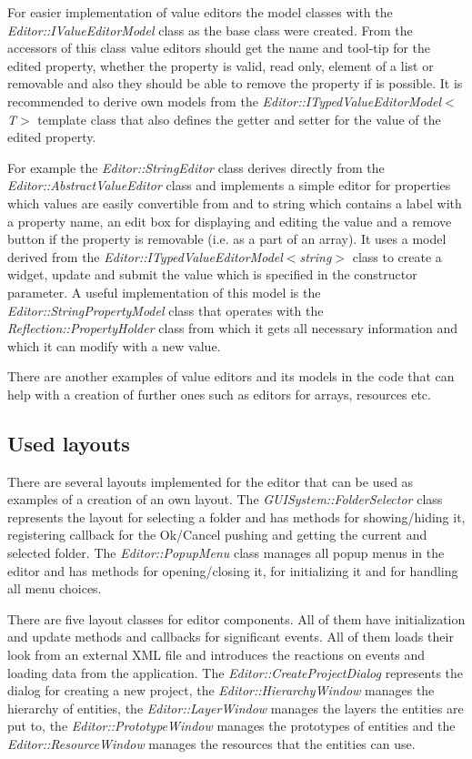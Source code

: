 For easier implementation of value editors the model classes with the \emph{Editor::IValueEditorModel} class as the base class were created. From the accessors of this class value editors should get the name and tool-tip for the edited property, whether the property is valid, read only, element of a list or removable and also they should be able to remove the property if is possible. It is recommended to derive own models from the \emph{Editor::ITypedValueEditor\-Model$<$T$>$} template class that also defines the getter and setter for the value of the edited property.

For example the \emph{Editor::StringEditor} class derives directly from the \emph{Editor::AbstractValueEditor} class and implements a simple editor for properties which values are easily convertible from and to string which contains a label with a property name, an edit box for displaying and editing the value and a remove button if the property is removable (i.e. as a part of an array). It uses a model derived from the \emph{Editor::ITypedValueEditorModel$<$string$>$} class to create a widget, update and submit the value which is specified in the constructor parameter. A useful implementation of this model is the \emph{Editor::StringPropertyModel} class that operates with the \emph{Reflection::Property\-Holder} class from which it gets all necessary information and which it can modify with a new value.

There are another examples of value editors and its models in the code that can help with a creation of further ones such as editors for arrays, resources etc.

\subsection{Used layouts}

There are several layouts implemented for the editor that can be used as examples of a creation of an own layout. The \emph{GUISystem::FolderSelector} class represents the layout for selecting a folder and has methods for showing/hiding it, registering callback for the Ok/Cancel pushing and getting the current and selected folder. The \emph{Editor::PopupMenu} class manages all popup menus in the editor and has methods for opening/closing it, for initializing it and for handling all menu choices.

There are five layout classes for editor components. All of them have initialization and update methods and callbacks for significant events. All of them loads their look from an external XML file and introduces the reactions on events and loading data from the application. The \emph{Editor::Create\-Project\-Dialog} represents the dialog for creating a new project, the \emph{Editor\-::\-Hierarchy\-Window} manages the hierarchy of entities, the \emph{Editor\-::\-Layer\-Window} manages the layers the entities are put to, the \emph{Editor\-::\-Prototype\-Window} manages the prototypes of entities and the \emph{Editor\-::\-Resource\-Window} manages the resources that the entities can use.

